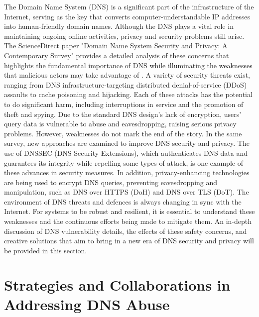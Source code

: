 The Domain Name System (DNS) is a significant part of the infrastructure of the Internet, serving as the key that converts computer-understandable IP addresses into human-friendly domain names. Although the DNS plays a vital role in maintaining ongoing online activities, privacy and security problems still arise. The ScienceDirect paper "Domain Name System Security and Privacy: A Contemporary Survey" provides a detailed analysis of these concerns that highlights the fundamental importance of DNS while illuminating the weaknesses that malicious actors may take advantage of \cite * {Sciencedirect2023dns}. A variety of security threats exist, ranging from DNS infrastructure-targeting distributed denial-of-service (DDoS) assaults to cache poisoning and hijacking. Each of these attacks has the potential to do significant harm, including interruptions in service and the promotion of theft and spying. Due to the standard DNS design's lack of encryption, users' query data is vulnerable to abuse and eavesdropping, raising serious privacy problems. However, weaknesses do not mark the end of the story. In the same survey, new approaches are examined to improve DNS security and privacy. The use of DNSSEC (DNS Security Extensions), which authenticates DNS data and guarantees its integrity while repelling some types of attack, is one example of these advances in security measures. In addition, privacy-enhancing technologies are being used to encrypt DNS queries, preventing eavesdropping and manipulation, such as DNS over HTTPS (DoH) and DNS over TLS (DoT). The environment of DNS threats and defences is always changing in sync with the Internet. For systems to be robust and resilient, it is essential to understand these weaknesses and the continuous efforts being made to mitigate them. An in-depth discussion of DNS vulnerability details, the effects of these safety concerns, and creative solutions that aim to bring in a new era of DNS security and privacy will be provided in this section.

\section{Strategies and Collaborations in Addressing DNS Abuse}


